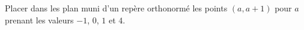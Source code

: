 
\begin{exercice}\label{exoSeconde-0007}

    Placer dans les plan muni d'un repère orthonormé les points \( (a,a+1)\) pour \( a\) prenant les valeurs \( -1\), \( 0\), \( 1\) et \( 4\).

\end{exercice}
